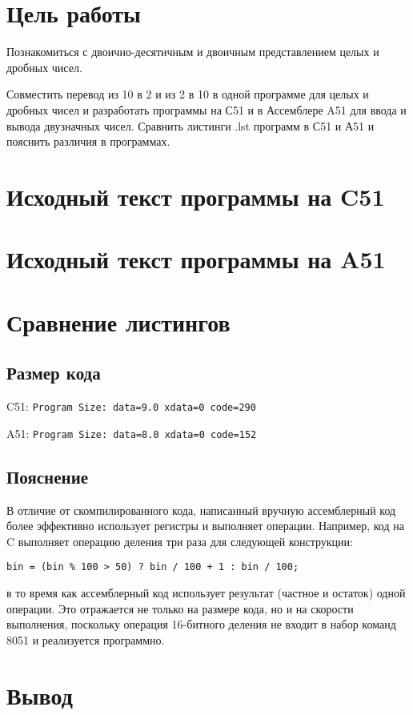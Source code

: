 \documentclass[ru, listings]{labreport}
\begin{document}
\maketitlepage

\section*{Цель работы}

Познакомиться с двоично-десятичным и двоичным представлением целых и дробных чисел.

Совместить перевод из 10 в 2 и из 2 в 10 в одной программе для целых и дробных чисел
и разработать программы на С51 и в Ассемблере A51 для ввода и вывода двузначных чисел.
Сравнить листинги .lst программ в С51 и А51 и пояснить различия в программах. 

\section*{Исходный текст программы на C51}



\section*{Исходный текст программы на A51}



\section*{Сравнение листингов}

\subsection*{Размер кода}

C51: \verb|Program Size: data=9.0 xdata=0 code=290|

A51: \verb|Program Size: data=8.0 xdata=0 code=152|

\subsection*{Пояснение}

В отличие от скомпилированного кода, написанный вручную ассемблерный код
более эффективно использует регистры и выполняет операции. Например,
код на C выполняет операцию деления три раза для следующей конструкции:

\begin{verbatim}
bin = (bin % 100 > 50) ? bin / 100 + 1 : bin / 100;
\end{verbatim}

\noindent
в то время как ассемблерный код использует результат (частное и остаток) одной операции.
Это отражается не только на размере кода, но и на скорости выполнения, поскольку
операция 16-битного деления не входит в набор команд 8051 и реализуется программно.

\section*{Вывод}
\end{document}
